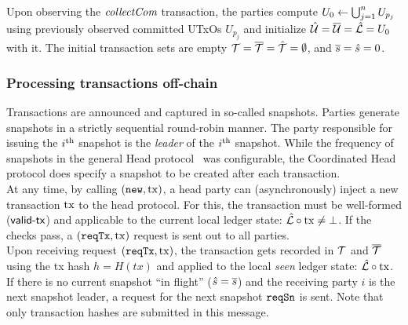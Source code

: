 \quad Upon observing the $\textit{collectCom}$
transaction, the parties compute $U_{0} \gets \bigcup_{j=1}^{n} U_{p_j}$ using
previously observed committed UTxOs $U_{p_j}$ and initialize
$\hat {\mathcal U} = \overline {\mathcal U} = \hat {\mathcal L} = U_{0}$ with it. The initial transaction sets are empty
${\mathcal T} = \overline {\mathcal T} =\hat {\mathcal T} =\emptyset$, and $\overline s = \hat s = 0$.

\subsubsection{Processing transactions off-chain}

Transactions are announced and captured in so-called snapshots. Parties generate
snapshots in a strictly sequential round-robin manner. The party responsible for
issuing the $i^{\text{th}}$ snapshot is the \emph{leader} of the $i^{\text{th}}$ snapshot.
While the frequency of snapshots in the general Head protocol~\cite{hydrahead20}
was configurable, the Coordinated Head protocol does specify a snapshot to be
created after each transaction.\\

\quad At any time, by calling $(\mathtt{new},\mathrm{tx})$, a head
party can (asynchronously) inject a new transaction $\mathrm{tx}$ to the head protocol.
For this, the transaction must be well-formed ($\mathsf{valid\textsf{-}{}tx}$) and applicable to the
current local ledger state: $\hat {\mathcal L} \circ \mathrm{tx} \neq \bot$. If the checks
pass, a $(\mathtt{reqTx},\mathrm{tx})$ request is sent out to all parties.\\

\quad Upon receiving request $(\mathtt{reqTx},\mathrm{tx})$, the transaction
gets recorded in ${\mathcal T}$ and $\overline {\mathcal T}$ using the tx hash $h = H(tx)$ and applied
to the local \emph{seen} ledger state: $\hat {\mathcal L} \circ \mathrm{tx}$. If there is no
current snapshot ``in flight'' ($\hat s = \overline s$) and the receiving party $i$ is
the next snapshot leader, a request for the next snapshot $\mathtt{reqSn}$ is sent. Note that only transaction hashes are submitted in this message.\\

